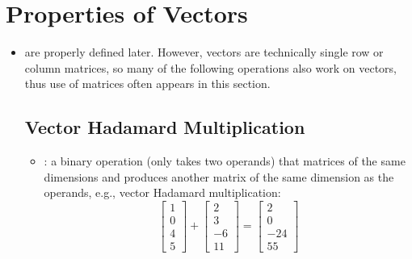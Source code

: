 \newpage
\section{Properties of Vectors}\label{Properties of Vectors}
\begin{itemize}
  \item \hyperref[Matrix Terminology]{} are properly defined later. However, vectors are technically single row or column matrices, so many of the following operations also work on vectors, thus use of matrices often appears in this section.
  
  \subsection{Vector Hadamard Multiplication}\label{Vector Hadamard Multiplication}
  \begin{itemize}
    \item {}: a binary operation (only takes two operands) that matrices of the same dimensions and produces another matrix of the same dimension as the operands, e.g., vector Hadamard multiplication:
    \[%
    \begin{bmatrix}
      1 \\
      0 \\
      4 \\
      5 
    \end{bmatrix}
    +
    \begin{bmatrix}
      2 \\
      3 \\
      -6 \\
      11
    \end{bmatrix}
    =
    \begin{bmatrix}
      2 \\
      0 \\
      -24 \\
      55
    \end{bmatrix}
    \]%
  \end{itemize}


\end{itemize}
